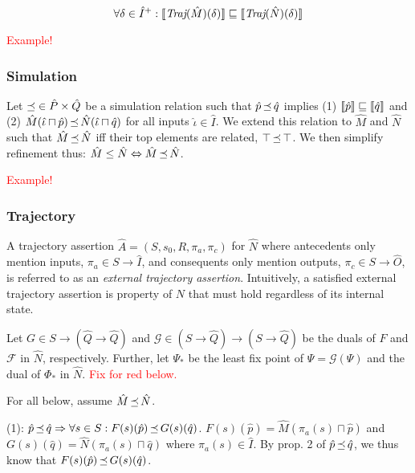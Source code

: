 \begin{equation*}
\forall \delta \in \hat I^{+} : \llbracket\textit{Traj}(\hat M)(\delta)\rrbracket \sqsubseteq \llbracket\textit{Traj}(\hat N)(\delta)\rrbracket
\end{equation*}

\textcolor{red}{Example!}

\subsubsection{Simulation} Let $\operatorname{\preceq} \in \hat P \times \hat Q$ be a simulation relation such that $\hat p \operatorname{\preceq} \hat q$ implies (1) $\llbracket\hat p\rrbracket \sqsubseteq \llbracket\hat q\rrbracket$ and (2) $\hat M(\hat \iota \sqcap \hat p) \operatorname{\preceq} \hat N(\hat \iota \sqcap \hat q)$ for all inputs $\hat \iota \in \hat I$. We extend this relation to $\hat M$ and $\hat N$ such that $\hat M \operatorname{\preceq} \hat N$ iff their top elements are related, $\top \operatorname{\preceq} \top$. We then simplify refinement thus: $\hat M \leq \hat N \Leftrightarrow \hat M \operatorname{\preceq} \hat N$.

\textcolor{red}{Example!}


\subsubsection{Trajectory} A trajectory assertion $\hat A = (S,s_{0},R,\pi_{a},\pi_{c})$ for $\hat N$ where antecedents only mention inputs, $\pi_{a} \in S \rightarrow \hat I$, and consequents only mention outputs, $\pi_{c} \in S \rightarrow \hat O$, is referred to as an \textit{external trajectory assertion}. Intuitively, a satisfied external trajectory assertion is property of $N$ that must hold regardless of its internal state.

Let $G \in S \rightarrow (\hat Q \rightarrow \hat Q)$ and $\mathcal{G} \in (S \rightarrow \hat Q) \rightarrow (S \rightarrow \hat Q)$ be the duals of $F$ and $\mathcal{F}$ in $\hat N$, respectively. Further, let $\Psi_{*}$ be the least fix point of $\Psi = \mathcal{G}(\Psi)$ and the dual of $\Phi_{*}$ in $\hat N$. \textcolor{red}{Fix for red below.}

For all below, assume $\hat M \operatorname{\preceq} \hat N$.

(1): $\hat p \operatorname{\preceq} \hat q \Rightarrow \forall s \in S : F(s)(\hat p) \operatorname{\preceq} G(s)(\hat q)$. $F(s)(\hat p) = \hat M(\pi_{a}(s) \sqcap \hat p)$ and $G(s)(\hat q) = \hat N(\pi_{a}(s) \sqcap \hat q)$ where $\pi_{a}(s) \in \hat I$. By prop. 2 of $\hat p \operatorname{\preceq} \hat q$, we thus know that $F(s)(\hat p) \operatorname{\preceq} G(s)(\hat q)$.

